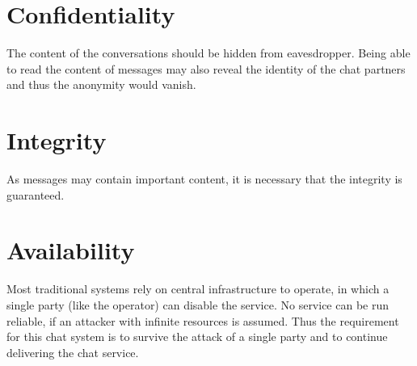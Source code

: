 \section{Confidentiality}
The content of the conversations should be hidden from eavesdropper.
Being able to read the content of messages may also reveal the identity
of the chat partners and thus the anonymity would vanish.

% 
\section{Integrity}
As messages may contain important content, it is necessary that the integrity
is guaranteed.
\section{Availability}
Most traditional systems rely on central infrastructure to operate, in which a
single party (like the operator) can disable the service. 
No service can be run reliable, if an attacker with infinite resources is assumed.
Thus the requirement for this chat system is to survive the attack of a single
party and to continue delivering the chat service.

